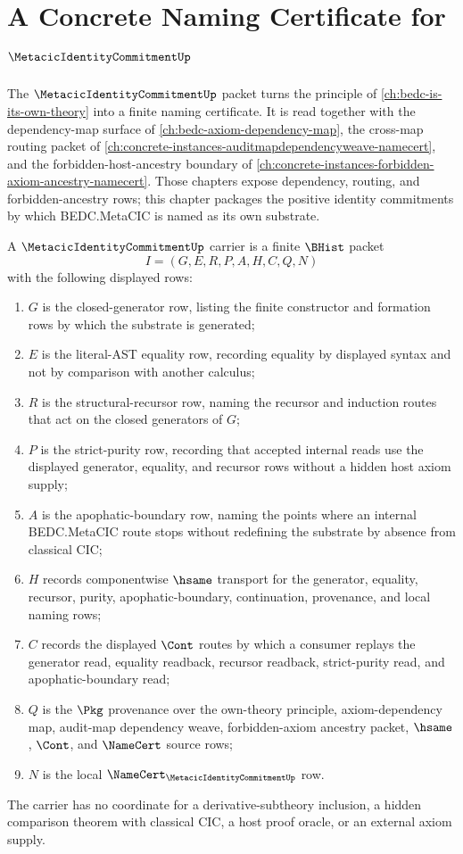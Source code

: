 \chapter{A Concrete Naming Certificate for $\MetacicIdentityCommitmentUp$}
\label{ch:concrete-instances-metacicidentitycommitment-namecert}

The $\MetacicIdentityCommitmentUp$ packet turns the principle of \autoref{ch:bedc-is-its-own-theory} into a finite naming certificate. It is read together with the dependency-map surface of \autoref{ch:bedc-axiom-dependency-map}, the cross-map routing packet of \autoref{ch:concrete-instances-auditmapdependencyweave-namecert}, and the forbidden-host-ancestry boundary of \autoref{ch:concrete-instances-forbidden-axiom-ancestry-namecert}. Those chapters expose dependency, routing, and forbidden-ancestry rows; this chapter packages the positive identity commitments by which BEDC.MetaCIC is named as its own substrate.

\begin{definition}
\label{def:metacic-identity-commitment-carrier}
A $\MetacicIdentityCommitmentUp$ carrier is a finite $\BHist$ packet
$$
I=(G,E,R,P,A,H,C,Q,N)
$$
with the following displayed rows:
\begin{enumerate}
\item $G$ is the closed-generator row, listing the finite constructor and formation rows by which the substrate is generated;
\item $E$ is the literal-AST equality row, recording equality by displayed syntax and not by comparison with another calculus;
\item $R$ is the structural-recursor row, naming the recursor and induction routes that act on the closed generators of $G$;
\item $P$ is the strict-purity row, recording that accepted internal reads use the displayed generator, equality, and recursor rows without a hidden host axiom supply;
\item $A$ is the apophatic-boundary row, naming the points where an internal BEDC.MetaCIC route stops without redefining the substrate by absence from classical CIC;
\item $H$ records componentwise $\hsame$ transport for the generator, equality, recursor, purity, apophatic-boundary, continuation, provenance, and local naming rows;
\item $C$ records the displayed $\Cont$ routes by which a consumer replays the generator read, equality readback, recursor readback, strict-purity read, and apophatic-boundary read;
\item $Q$ is the $\Pkg$ provenance over the own-theory principle, axiom-dependency map, audit-map dependency weave, forbidden-axiom ancestry packet, $\hsame$, $\Cont$, and $\NameCert$ source rows;
\item $N$ is the local $\NameCert_{\MetacicIdentityCommitmentUp}$ row.
\end{enumerate}
The carrier has no coordinate for a derivative-subtheory inclusion, a hidden comparison theorem with classical CIC, a host proof oracle, or an external axiom supply.
\end{definition}

